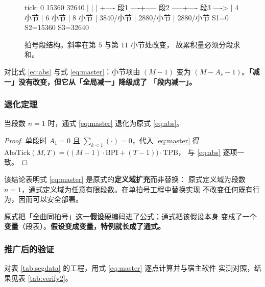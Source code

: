 \documentclass[11pt,a4paper,fontset=none]{ctexart}
\begin{document}
\begin{figure}[htbp]
\centering
\begin{示意图}
tick:   0                15360              32640
        |                  |                  |
        +---- 段1 ----+----- 段2 -----+---- 段3 ---->
        |  4 小节      |  6 小节       |  8 小节
        |  3840/小节   |  2880/小节    |  2880/小节
       S1=0          S2=15360        S3=32640
\end{示意图}
\caption{拍号段结构。斜率在第 $5$ 与第 $11$ 小节处改变，
故累积量必须分段求和。}
\label{fig:segments}
\end{figure}

\begin{注记}[「减一」的降级]
对比式 \eqref{eq:abs} 与式 \eqref{eq:master}：小节项由 $(M-1)$ 变为
$(M-A_s-1)$。\textbf{「减一」没有改变，但它从「全局减一」降级成了
「段内减一」。}
\end{注记}

\subsubsection{退化定理}

\begin{定理}[退化性]
当段数 $n=1$ 时，通式 \eqref{eq:master} 退化为原式 \eqref{eq:abs}。
\end{定理}

\begin{proof}
单段时 $A_1=0$ 且 $\sum_{k<1}(\cdot)=0$，代入 \eqref{eq:master} 得
$\mathrm{AbsTick}(M,T)=\bigl((M-1)\cdot\mathrm{BPI}+(T-1)\bigr)\cdot\mathrm{TPB}$，
与 \eqref{eq:abs} 逐项一致。
\end{proof}

该结论表明式 \eqref{eq:master} 是原式的\textbf{定义域扩充}而非替换：
原式定义域为段数 $n=1$，通式定义域为任意有限段数。在单拍号工程中替换实现
不改变任何既有行为，因而可以安全部署。

\begin{注记}[假设变成变量]
原式把「全曲同拍号」这一\textbf{假设}硬编码进了公式；通式把该假设本身
变成了一个\textbf{变量}（段表）。\textbf{假设变成变量，特例就长成了通式。}
\end{注记}

\subsubsection{推广后的验证}

对表 \ref{tab:segdata} 的工程，用式 \eqref{eq:master} 逐点计算并与宿主软件
实测对照，结果见表 \ref{tab:verify2}。
\end{document}

